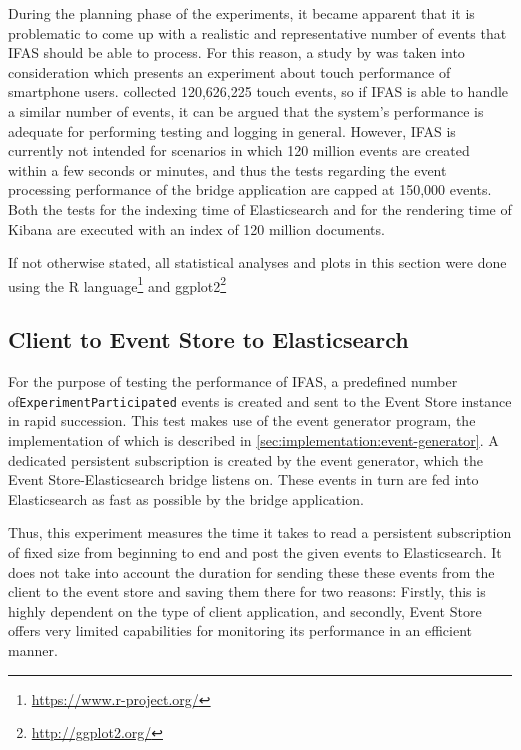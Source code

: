 During the planning phase of the experiments, it became apparent that it is problematic to come up with a realistic and representative number of events that \ac{IFAS} should be able to process.
For this reason, a study by \citet{Henze2011} was taken into consideration which presents an experiment about touch performance of smartphone users.
\citeauthor{Henze2011} collected 120,626,225 touch events, so if \ac{IFAS} is able to handle a similar number of events, it can be argued that the system's performance is adequate for performing testing and logging in general.
However, \ac{IFAS} is currently not intended for scenarios in which 120 million events are created within a few seconds or minutes, and thus the tests regarding the event processing performance of the bridge application are capped at 150,000 events.
Both the tests for the indexing time of Elasticsearch and for the rendering time of Kibana are executed with an index of 120 million documents.

If not otherwise stated, all statistical analyses and plots in this section were done using the R language\footnote{\url{https://www.r-project.org/}} and ggplot2\footnote{\url{http://ggplot2.org/}}

\subsection{Client to Event Store to Elasticsearch}
\label{subsec:evaluation:performance:evt-es-bridge}

For the purpose of testing the performance of \ac{IFAS}, a predefined number of\linebreak \texttt{ExperimentParticipated} events is created and sent to the Event Store instance in rapid succession.
This test makes use of the event generator program, the implementation of which is described in \cref{sec:implementation:event-generator}.
A dedicated persistent subscription is created by the event generator, which the Event Store-Elasticsearch bridge listens on.
These events in turn are fed into Elasticsearch as fast as possible by the bridge application.

Thus, this experiment measures the time it takes to read a persistent subscription of fixed size from beginning to end and post the given events to Elasticsearch.
It does not take into account the duration for sending these these events from the client to the event store and saving them there for two reasons:
Firstly, this is highly dependent on the type of client application, and secondly, Event Store offers very limited capabilities for monitoring its performance in an efficient manner.


